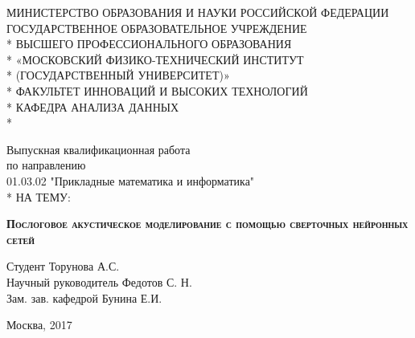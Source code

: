 \documentclass[a4paper,14pt]{extarticle}
\begin{document}
\begin{titlepage}
	\newpage
	\fontsize{12pt}{12pt}\selectfont
	\begin{center}
		МИНИСТЕРСТВО ОБРАЗОВАНИЯ И НАУКИ РОССИЙСКОЙ ФЕДЕРАЦИИ \\
		\vspace{1 cm}
		ГОСУДАРСТВЕННОЕ ОБРАЗОВАТЕЛЬНОЕ УЧРЕЖДЕНИЕ \\* 
		ВЫСШЕГО ПРОФЕССИОНАЛЬНОГО ОБРАЗОВАНИЯ \\* 
		«МОСКОВСКИЙ ФИЗИКО-ТЕХНИЧЕСКИЙ ИНСТИТУТ \\* 
		(ГОСУДАРСТВЕННЫЙ УНИВЕРСИТЕТ)» \\*
		\vspace{1 cm}
		ФАКУЛЬТЕТ ИННОВАЦИЙ И ВЫСОКИХ ТЕХНОЛОГИЙ \\*
		КАФЕДРА АНАЛИЗА ДАННЫХ \\*
		\hrulefill
	\end{center}
	
	\vspace{8em}
	
	\begin{center}
		\Large Выпускная квалификационная работа \\ по направлению \\ 01.03.02 "Прикладные математика и информатика"\\*
		НА ТЕМУ:
	\end{center}
	
	
	\vspace{2.5em}
	
	\begin{center}
		\textsc{\textbf{Послоговое акустическое моделирование с помощью сверточных нейронных сетей}}
	\end{center}
	
	\vspace{6em}
	
	\begin{flushleft}
		Студент \hrulefill Торунова А.С. \\
		\vspace{1.5em}
		Научный руководитель \hrulefill Федотов С. Н.\\
		\vspace{1.5em}
		Зам. зав. кафедрой  \hrulefill Бунина Е.И.
	\end{flushleft}
	
	\vspace{\fill}
	
	\begin{center}
		Москва, 2017
	\end{center}
	
\end{titlepage}
\tableofcontents
\newpage
\end{document}
